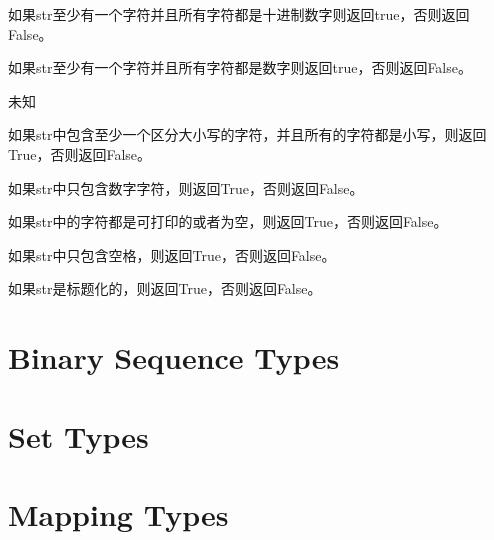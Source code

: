\noindent{\color{red}{str.isdecimal():}}
\par{如果str至少有一个字符并且所有字符都是十进制数字则返回true，否则返回False。}\\

\noindent{\color{red}{str.isdigit():}}
\par{如果str至少有一个字符并且所有字符都是数字则返回true，否则返回False。}\\

\noindent{\color{red}{str.isidentifier():}}
\par{未知}\\

\noindent{\color{red}{str.islower():}}
\par{如果str中包含至少一个区分大小写的字符，并且所有的字符都是小写，则返回True，否则返回False。}\\

\noindent{\color{red}{str.isnumeric():}}
\par{如果str中只包含数字字符，则返回True，否则返回False。}\\

\noindent{\color{red}{str.isprintable():}}
\par{如果str中的字符都是可打印的或者为空，则返回True，否则返回False。}\\

\noindent{\color{red}{str.isspace():}}
\par{如果str中只包含空格，则返回True，否则返回False。}\\

\noindent{\color{red}{str.istitle():}}
\par{如果str是标题化的，则返回True，否则返回False。}\\




\section{Binary Sequence Types}





\section{Set Types}





\section{Mapping Types}





